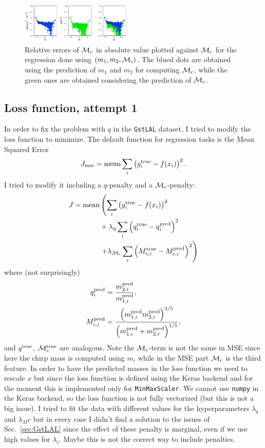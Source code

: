 \documentclass[prd,aps,twocolumn,a4paper,showkeys,nofootinbib]{revtex4-1}
\def\Mc{{\cal M}_c}
\begin{document}
%
\begin{figure}[]
  \center
  \includegraphics[width=0.47\textwidth]{./Figs/Mc_pred_errors_m1m2.png}
  \caption{\label{fig:Mc_pred_errors} Relative errors of $\Mc$ in absolute value 
  plotted against $\Mc$ for the regression done using $(m_1, m_2, \Mc)$. 
  The blued dots are obtained using the prediction of $m_1$ and $m_2$ for computing
  $\Mc$, while the green ones are obtained considering the prediction of $\Mc$.}
\end{figure}


\subsection{Loss function, attempt 1}
\label{sec:loss}
In order to fix the problem with $q$ in the \texttt{GstLAL} dataset, 
I tried to modify the loss function to minimize.
The default function for regression tasks is the Mean Squared Error
\begin{equation}
J_{\rm mse} = {\rm mean} \sum_i \left( y^{\rm true}_i - f(x_i) \right)^2 .
\end{equation}
I tried to modify it including a $q$-penalty and a $\Mc$-penalty:
\begin{align}
J =  {\rm mean} & \left(  \sum_i \left( y^{\rm true}_i - f(x_i) \right)^2 \right.   \nonumber \\
&  + \lambda_{\rm q} \sum_i \left( q^{\rm true}_i - q^{\rm pred}_i \right)^2
\nonumber \\
& \left. + \lambda_{\rm \Mc} \sum_i \left( M_{c,i}^{\rm true} - M_{c,i}^{\rm pred} \right)^2 \right)
\end{align}
where (not surprisingly)
\begin{align}
q^{\rm pred}_i &  = \frac{m_{2,i}^{\rm pred}}{m_{1,i}^{\rm pred}}, \\
M_{c,i}^{\rm pred} & = 
\frac{\left(m_{1,i}^{\rm pred}m_{2,i}^{\rm pred} \right)^{3/5}}{\left(m_{1,i}^{\rm pred}+m_{2,i}^{\rm pred}\right)^{1/5}},
\end{align}
and $q^{\rm true}$, $\Mc^{\rm true}$ are analogous. Note the $\Mc$-term is not the same 
in MSE since here the chirp mass is computed using $m_i$ while in the MSE part $\Mc$ 
is the third feature.
In order to have the predicted masses in the loss function we need to 
rescale $x$ but since the loss function is defined using the Keras backend and 
for the moment this is implemented only for  \texttt{MinMaxScaler}. 
We cannot use \texttt{numpy} in the Keras backend, so the loss function is not fully vectorized
(but this is not a big issue). 
I tried to fit the data with different values for the hyperparameters $\lambda_q$ and
$\lambda_Mc$ but in every case I didn't find a solution to the issues of Sec.~\ref{sec:GstLAL}
since the effect of these penalty is marginal, even if we use high values for $\lambda_i$.
Maybe this is not the correct way to include penalties. 
\end{document}
